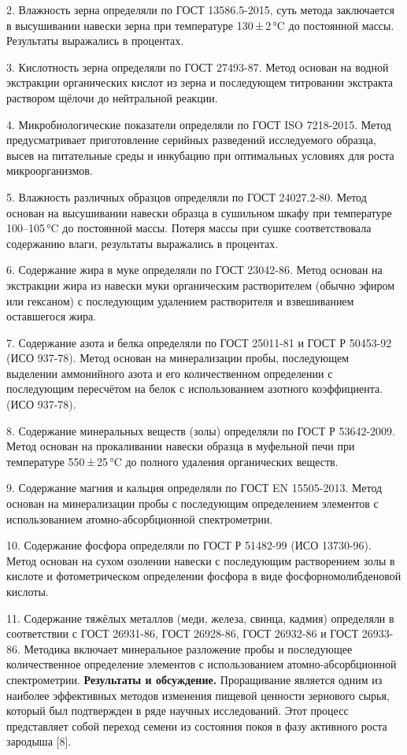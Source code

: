 \begin{multicols}{2}
2. Влажность зерна определяли по ГОСТ 13586.5-2015, суть метода
заключается в высушивании навески зерна при температуре 130\,±\,2\,°C
до постоянной массы. Результаты выражались в процентах.

3. Кислотность зерна определяли по ГОСТ 27493-87. Метод основан на водной
экстракции органических кислот из зерна и последующем титровании
экстракта раствором щёлочи до нейтральной реакции.

4. Микробиологические показатели определяли по ГОСТ ISO 7218-2015. Метод
предусматривает приготовление серийных разведений исследуемого
образца, высев на питательные среды и инкубацию при оптимальных
условиях для роста микроорганизмов.

5. Влажность различных образцов определяли по ГОСТ 24027.2-80. Метод
основан на высушивании навески образца в сушильном шкафу при
температуре 100--105\,°C до постоянной массы. Потеря массы при сушке
соответствовала содержанию влаги, результаты выражались в процентах.

6. Содержание жира в муке определяли по ГОСТ 23042-86. Метод основан на
экстракции жира из навески муки органическим растворителем (обычно
эфиром или гексаном) с последующим удалением растворителя и
взвешиванием оставшегося жира.

7. Содержание азота и белка определяли по ГОСТ 25011-81 и ГОСТ Р 50453-92
(ИСО 937-78). Метод основан на минерализации пробы, последующем
выделении аммонийного азота и его количественном определении с
последующим пересчётом на белок с использованием азотного
коэффициента. (ИСО 937-78).

8. Содержание минеральных веществ (золы) определяли по ГОСТ Р
53642-2009. Метод основан на прокаливании навески образца в муфельной
печи при температуре 550\,±\,25\,°C до полного удаления органических
веществ.

9. Содержание магния и кальция определяли по ГОСТ EN 15505-2013. Метод
основан на минерализации пробы с последующим определением элементов с
использованием атомно-абсорбционной спектрометрии.

10. Содержание фосфора определяли по ГОСТ Р 51482-99 (ИСО 13730-96). Метод
основан на сухом озолении навески с последующим растворением золы в
кислоте и фотометрическом определении фосфора в виде
фосфорномолибденовой кислоты.

11. Содержание тяжёлых металлов (меди, железа, свинца, кадмия) определяли
в соответствии с ГОСТ 26931-86, ГОСТ 26928-86, ГОСТ 26932-86 и ГОСТ
26933-86. Методика включает минеральное разложение пробы и последующее
количественное определение элементов с использованием
атомно-абсорбционной спектрометрии.
{\bfseries Результаты и обсуждение.} Проращивание является одним из
наиболее эффективных методов изменения пищевой ценности зернового сырья,
который был подтвержден в ряде научных исследований. Этот процесс
представляет собой переход семени из состояния покоя в фазу активного
роста зародыша {[}8{]}.


\end{multicols}
